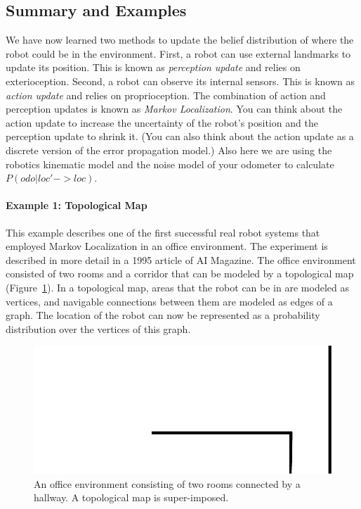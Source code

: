 \subsection{Summary and Examples}
We have now learned two methods to update the belief distribution of where the robot could be in the environment. First, a robot can use external landmarks to update its position. This is known as \emph{perception update} and relies on exterioception. Second, a robot can observe its internal sensors. This is known as \emph{action update} and relies on proprioception. The combination of action and perception updates is known as \emph{Markov Localization}. You can think about the action update to increase the uncertainty of the robot's position and the perception update to shrink it. (You can also think about the action update as a discrete version of the error propagation model.) Also here we are using the robotics kinematic model and the noise model of your odometer to calculate $ P(odo|loc'->loc)$.

\paragraph{Example 1: Topological Map}
This example describes one of the first successful real robot systems that employed Markov Localization in an office environment. The experiment is described in more detail in a 1995 article of AI Magazine\cite{nourbakhsh1995dervish}. The office environment consisted of two rooms and a corridor that can be modeled by a topological map (Figure~\ref{fig:dervish_example}). In a topological map, areas that the robot can be in are modeled as vertices, and navigable connections between them are modeled as edges of a graph. The location of the robot can now be represented as a probability distribution over the vertices of  this graph.

\begin{figure}
	\centering
		\includegraphics[width=\textwidth]{figs/dervish_example}
	\caption{An office environment consisting of two rooms connected by a hallway. A topological map is super-imposed.}
	\label{fig:dervish_example}
\end{figure}


